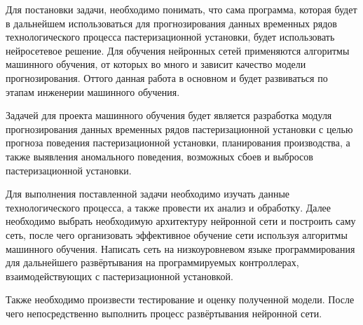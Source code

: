 {\cyrillicfont %
\fontsize{13pt}{16.25pt}\selectfont %
\englishfont %

  \par \redline Для постановки задачи, необходимо понимать, что сама программа, которая будет в дальнейшем использоваться для прогнозирования данных временных рядов технологического процесса пастеризационной установки, будет использовать нейросетевое решение. Для обучения нейронных сетей применяются алгоритмы машинного обучения, от которых во много и зависит качество модели прогнозирования. Оттого данная работа в основном и будет развиваться по этапам инженерии машинного обучения. 

  \par \redline Задачей для проекта машинного обучения будет является разработка модуля прогнозирования данных временных рядов пастеризационной установки с целью прогноза поведения пастеризационной установки, планирования производства, а также выявления аномального поведения, возможных сбоев и выбросов пастеризационной установки. 

  \par \redline Для выполнения поставленной задачи необходимо изучать данные технологического процесса, а также провести их анализ и обработку. Далее необходимо выбрать необходимую архитектуру нейронной сети и построить саму сеть, после чего организовать эффективное обучение сети используя алгоритмы машинного обучения.  Написать сеть на низкоуровневом языке программирования для дальнейшего развёртывания на программируемых контроллерах, взаимодействующих с пастеризационной установкой. 

  \par \redline Также необходимо произвести тестирование и оценку полученной модели. После чего непосредственно выполнить процесс развёртывания нейронной сети.  

  \par %
}


